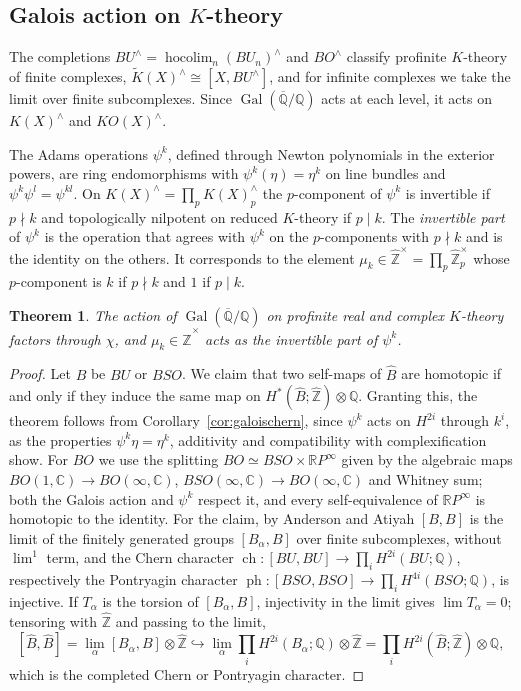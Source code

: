 \documentclass[11pt]{amsart}
\theoremstyle{plain}
\newtheorem{theorem}{Theorem}[section]
\theoremstyle{definition}
\numberwithin{equation}{section}
\newcommand{\Q}{\mathbb{Q}}
\newcommand{\C}{\mathbb{C}}
\newcommand{\Zhat}{\widehat{\mathbb{Z}}}
\newcommand{\Qbar}{\overline{\mathbb{Q}}}
\newcommand{\RP}{\mathbb{R}P}
\newcommand{\KO}{\mathit{KO}}
\newcommand{\units}{^{\times}}
\DeclareMathOperator{\Gal}{Gal}
\DeclareMathOperator{\ch}{ch}
\DeclareMathOperator{\ph}{ph}
\DeclareMathOperator{\hocolim}{hocolim}
\begin{document}
\subsection{Galois action on $K$-theory}
The completions $BU^\wedge=\hocolim_n(BU_n)^\wedge$ and $BO^\wedge$ classify profinite $K$-theory of finite complexes, $\widetilde K(X)^\wedge\cong[X,BU^\wedge]$, and for infinite complexes we take the limit over finite subcomplexes.
Since $\Gal(\Qbar/\Q)$ acts at each level, it acts on $K(X)^\wedge$ and $\KO(X)^\wedge$.

The Adams operations $\psi^k$, defined through Newton polynomials in the exterior powers, are ring endomorphisms with $\psi^k(\eta)=\eta^k$ on line bundles and $\psi^k\psi^l=\psi^{kl}$.
On $K(X)^\wedge=\prod_pK(X)^\wedge_p$ the $p$-component of $\psi^k$ is invertible if $p\nmid k$ and topologically nilpotent on reduced $K$-theory if $p\mid k$.
The \emph{invertible part} of $\psi^k$ is the operation that agrees with $\psi^k$ on the $p$-components with $p\nmid k$ and is the identity on the others.
It corresponds to the element $\mu_k\in\Zhat\units=\prod_p\Zhat_p\units$ whose $p$-component is $k$ if $p\nmid k$ and $1$ if $p\mid k$.

\begin{theorem}\label{thm:galoisK}
The action of $\Gal(\Qbar/\Q)$ on profinite real and complex $K$-theory factors through $\chi$, and $\mu_k\in\Zhat\units$ acts as the invertible part of $\psi^k$.
\end{theorem}

\begin{proof}
Let $B$ be $BU$ or $BSO$.
We claim that two self-maps of $\widehat B$ are homotopic if and only if they induce the same map on $H^*(\widehat B;\Zhat)\otimes\Q$.
Granting this, the theorem follows from Corollary~\ref{cor:galoischern}, since $\psi^k$ acts on $H^{2i}$ through $k^i$, as the properties $\psi^k\eta=\eta^k$, additivity and compatibility with complexification show.
For $BO$ we use the splitting $BO\simeq BSO\times\RP^\infty$ given by the algebraic maps $BO(1,\C)\to BO(\infty,\C)$, $BSO(\infty,\C)\to BO(\infty,\C)$ and Whitney sum; both the Galois action and $\psi^k$ respect it, and every self-equivalence of $\RP^\infty$ is homotopic to the identity.
For the claim, by Anderson and Atiyah $[B,B]$ is the limit of the finitely generated groups $[B_\alpha,B]$ over finite subcomplexes, without $\lim^1$ term, and the Chern character $\ch\colon[BU,BU]\to\prod_iH^{2i}(BU;\Q)$, respectively the Pontryagin character $\ph\colon[BSO,BSO]\to\prod_iH^{4i}(BSO;\Q)$, is injective.
If $T_\alpha$ is the torsion of $[B_\alpha,B]$, injectivity in the limit gives $\lim T_\alpha=0$; tensoring with $\Zhat$ and passing to the limit,
\[
[\widehat B,\widehat B]=\lim_\alpha[B_\alpha,B]\otimes\Zhat\hookrightarrow\lim_\alpha\prod_iH^{2i}(B_\alpha;\Q)\otimes\Zhat=\prod_iH^{2i}(\widehat B;\Zhat)\otimes\Q,
\]
which is the completed Chern or Pontryagin character.
\end{proof}
\end{document}
